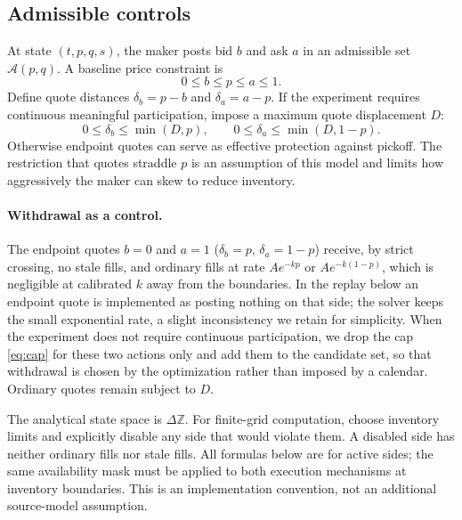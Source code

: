 \documentclass[11pt]{article}
\newcommand{\1}{\mathbf 1}
\newcommand{\A}{\mathcal A}
\begin{document}
\subsection{Admissible controls}
At state $(t,p,q,s)$, the maker posts bid $b$ and ask $a$ in an admissible set
$\A(p,q)$. A baseline price constraint is
\begin{equation}
 0\le b\le p\le a\le1.
 \label{eq:quotes}
\end{equation}
Define quote distances $\delta_b=p-b$ and $\delta_a=a-p$.
If the experiment requires continuous meaningful participation, impose a
maximum quote displacement $D$:
\begin{equation}
 0\le\delta_b\le\min(D,p),\qquad
 0\le\delta_a\le\min(D,1-p).
 \label{eq:cap}
\end{equation}
Otherwise endpoint quotes can serve as effective protection against pickoff.
The restriction that quotes straddle $p$ is an assumption of this model and limits how aggressively
the maker can skew to reduce inventory.

\paragraph{Withdrawal as a control.} The endpoint quotes $b=0$ and $a=1$
($\delta_b=p$, $\delta_a=1-p$) receive, by strict crossing, no stale
fills, and ordinary fills at rate $Ae^{-kp}$ or $Ae^{-k(1-p)}$, which is
negligible at calibrated $k$ away from the boundaries. In the replay below an endpoint
quote is implemented as posting nothing on that side; the solver keeps the small
exponential rate, a slight inconsistency we retain for simplicity. When the experiment does not require continuous
participation, we drop the cap \eqref{eq:cap} for these two actions only and
add them to the candidate set, so that withdrawal is chosen by the optimization
rather than imposed by a calendar. Ordinary quotes remain subject to $D$.

The analytical state space is $\Delta\mathbb Z$. For finite-grid computation,
choose inventory limits and explicitly disable any side that would violate
them. A disabled side has neither ordinary fills nor stale fills. All formulas
below are for active sides; the same availability mask must be applied to both
execution mechanisms at inventory boundaries. This is an implementation
convention, not an additional source-model assumption.
\end{document}
